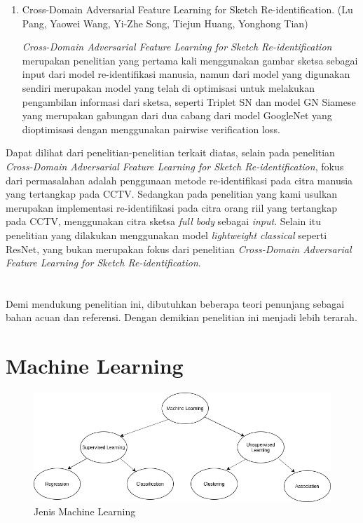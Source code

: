 \begin{enumerate}
	\item Cross-Domain Adversarial Feature Learning for Sketch
	Re-identification. (Lu Pang, Yaowei Wang, Yi-Zhe Song, Tiejun Huang, Yonghong Tian) \cite{cit:12}
	\par
	
	\textit{Cross-Domain Adversarial Feature Learning for Sketch Re-identification} merupakan penelitian yang pertama kali menggunakan gambar sketsa sebagai input dari model re-identifikasi manusia, namun dari model yang digunakan sendiri merupakan model yang telah di optimisasi untuk melakukan pengambilan informasi dari sketsa, seperti Triplet SN dan model GN Siamese yang merupakan gabungan dari dua cabang dari model GoogleNet yang dioptimisasi dengan menggunakan pairwise verification loss.
	\vspace{1ex}
	
\end{enumerate}
\par Dapat dilihat dari penelitian-penelitian terkait diatas, selain pada penelitian \textit{Cross-Domain Adversarial Feature Learning for Sketch Re-identification}, fokus dari permasalahan adalah penggunaan metode re-identifikasi pada citra manusia yang tertangkap pada CCTV. Sedangkan pada penelitian yang kami usulkan merupakan implementasi re-identifikasi pada citra orang riil yang tertangkap pada CCTV, menggunakan citra sketsa \textit{full body} sebagai \textit{input}.
Selain itu penelitian yang dilakukan menggunakan model \textit{lightweight classical} seperti ResNet, yang bukan merupakan fokus dari penelitian \textit{Cross-Domain Adversarial Feature Learning for Sketch Re-identification}.
\vspace{1ex}

\section*{}
Demi mendukung penelitian ini, dibutuhkan beberapa teori penunjang sebagai bahan acuan dan referensi. Dengan demikian penelitian ini menjadi lebih terarah. 
\vspace{1ex}

\section{Machine Learning}
\vspace{1ex}

\begin{figure} [!htb]
	\centering
	\includegraphics[scale=0.28]{img/machinelearning.png}
	\caption{Jenis Machine Learning}
	\label{fig:2.0}
\end{figure}


